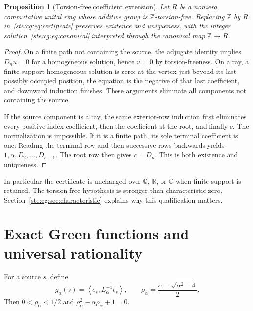 \documentclass[11pt,letterpaper]{article}
\newtheorem{proposition}[theorem]{Proposition}
\theoremstyle{definition}
\theoremstyle{remark}
\newcommand{\Z}{\mathbb Z}
\newcommand{\Q}{\mathbb Q}
\newcommand{\R}{\mathbb R}
\newcommand{\C}{\mathbb C}
\newcommand{\ip}[2]{\left\langle#1,#2\right\rangle}
\begin{document}
\begin{proposition}[Torsion-free coefficient extension]\label{ste:cg:prop:torsionfree}
Let $R$ be a nonzero commutative unital ring whose additive group is
$\Z$-torsion-free. Replacing $\Z$ by $R$ in~\eqref{ste:cg:eq:certificate} preserves
existence and uniqueness, with the integer solution~\eqref{ste:cg:eq:canonical}
interpreted through the canonical map $\Z\to R$.
\end{proposition}
\begin{proof}
On a finite path not containing the source, the adjugate identity implies
$D_n u=0$ for a homogeneous solution, hence $u=0$ by torsion-freeness.
On a ray, a finite-support homogeneous solution is zero: at the vertex
just beyond its last possibly occupied position, the equation is the
negative of that last coefficient, and downward induction finishes.
These arguments eliminate all components not containing the source.

If the source component is a ray, the same exterior-row induction first
eliminates every positive-index coefficient, then the coefficient at the
root, and finally $c$. The normalization is impossible. If it is a finite
path, its sole terminal coefficient is one. Reading the terminal row and
then successive rows backwards yields $1,\alpha,D_2,\ldots,D_{n-1}$.
The root row then gives $c=D_n$. This is both existence and uniqueness.
\end{proof}

In particular the certificate is unchanged over $\Q$, $\R$, or $\C$ when
finite support is retained. The torsion-free hypothesis is stronger than
characteristic zero. Section~\ref{ste:cg:sec:characteristic} explains why this
qualification matters.

\section{Exact Green functions and universal rationality}\label{ste:cg:sec:green}
For a source $s$, define
\begin{equation}\label{ste:cg:eq:green}
 g_\alpha(s)=\ip{e_s}{L_\alpha^{-1}e_s},\qquad
 \rho_\alpha=\frac{\alpha-\sqrt{\alpha^2-4}}2.
\end{equation}
Then $0<\rho_\alpha<1/2$ and
$\rho_\alpha^2-\alpha\rho_\alpha+1=0$.
\end{document}
